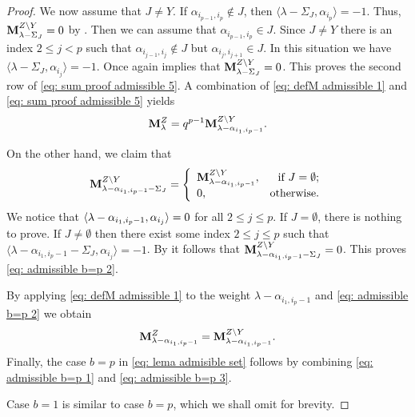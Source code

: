 \begin{proof}
We now assume that $J\neq Y$.
If $\alpha_{i_{p-1},i_{p}}\not\in J$, then $\langle\lambda-\Sigma_{J},\alpha_{i_{p}}\rangle =-1$. 
Thus, $\mathbf{M}_{\lambda -\Sigma_J}^{Z\setminus Y}=0$ by . 
Then we can assume that $\alpha_{i_{p-1},i_{p}}\in J$. 
Since $J\neq Y$ there is an index $2\leq j <p$ such that $\alpha_{i_{j-1},i_{j}} \not\in J$ but $\alpha_{i_{j},i_{j+1}}\in J$. 
In this situation we have $\langle \lambda-\Sigma_{J},\alpha_{i_{j}}\rangle =-1$. 
Once again  implies that $\mathbf{M}_{\lambda -\Sigma_J}^{Z\setminus Y}=0$. 
This proves the second row of \eqref{eq: sum proof admissible 5}. 
A combination of \eqref{eq: defM admissible 1} and \eqref{eq: sum proof admissible 5} yields 
\begin{equation}\label{eq: admissible b=p 1}
    \mathbf{M}_{\lambda}^Z   =  q^{p-1}\mathbf{M}_{\lambda-\alpha_{i_{1},i_{p}-1}}^{Z\setminus Y}. 
\end{equation}

On the other hand, we claim that
\begin{equation}\label{eq: admissible b=p 2}
    \mathbf{M}_{\lambda - \alpha_{i_{1},i_{p}-1}-\Sigma_{J}}^{Z\setminus Y} = \left\{\begin{array}{lr}
        \mathbf{M}_{\lambda - \alpha_{i_{1},i_{p}-1}}^{Z\setminus Y}, &\text{if } J=\emptyset;  \\
        0, &\text{otherwise}.
    \end{array}\right.
\end{equation}
We notice that $\langle \lambda - \alpha_{i_{1},i_{p}-1} , \alpha_{i_j} \rangle=0$ for all $2\leq j \leq p $. If $J=\emptyset$, there is nothing to prove. 
If $J\neq \emptyset$ then there exist some index $2\leq j\leq p$ such that $\langle\lambda - \alpha_{i_{1},i_{p}-1} - \Sigma_{J},\alpha_{i_{j}}\rangle = -1$. 
By   it follows that $\mathbf{M}_{\lambda - \alpha_{i_{1},i_{p}-1} - \Sigma_{J}}^{Z\setminus Y} = 0$.
This proves \eqref{eq: admissible b=p 2}. 

\medskip
By applying \eqref{eq: defM admissible 1} to the weight $ \lambda - \alpha_{i_{1},i_{p}-1}$ and \eqref{eq: admissible b=p 2} we obtain 
\begin{equation}\label{eq: admissible b=p 3}
    \mathbf{M}_{\lambda - \alpha_{i_{1},i_{p}-1}}^Z  =    \mathbf{M}_{\lambda - \alpha_{i_{1},i_{p}-1}}^{Z\setminus Y}.
\end{equation}
Finally, the case $b=p$ in   \eqref{eq: lema admisible set} follows by combining \eqref{eq: admissible b=p 1} and \eqref{eq: admissible b=p 3}. 

\medskip
Case $b=1$ is similar to case $b=p$, which we shall omit for brevity.
\end{proof}







